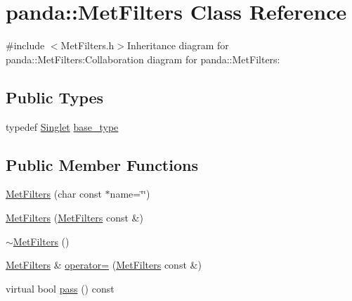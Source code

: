 \hypertarget{classpanda_1_1MetFilters}{
\section{panda::MetFilters Class Reference}
\label{classpanda_1_1MetFilters}
}


{\ttfamily \#include $<$MetFilters.h$>$}Inheritance diagram for panda::MetFilters:Collaboration diagram for panda::MetFilters:\subsection*{Public Types}
\begin{DoxyCompactItemize}
\item 
typedef \hyperlink{classpanda_1_1Singlet}{Singlet} \hyperlink{classpanda_1_1MetFilters_aa9b343ca5027d2786a87123abe1b0630}{base\_\-type}
\end{DoxyCompactItemize}
\subsection*{Public Member Functions}
\begin{DoxyCompactItemize}
\item 
\hyperlink{classpanda_1_1MetFilters_a165bae4810eedbd7fdee7259382398cf}{MetFilters} (char const $\ast$name=\char`\"{}\char`\"{})
\item 
\hyperlink{classpanda_1_1MetFilters_a2b0fb3d488715124a4bb61c4369fdb4b}{MetFilters} (\hyperlink{classpanda_1_1MetFilters}{MetFilters} const \&)
\item 
\hyperlink{classpanda_1_1MetFilters_a39343453635116981e0f1e8685333897}{$\sim$MetFilters} ()
\item 
\hyperlink{classpanda_1_1MetFilters}{MetFilters} \& \hyperlink{classpanda_1_1MetFilters_a7afdb0c8ff9d453cb699a8895ac07afa}{operator=} (\hyperlink{classpanda_1_1MetFilters}{MetFilters} const \&)
\item 
virtual bool \hyperlink{classpanda_1_1MetFilters_a36ea7af365dd672dddcdb1ed4e5b8a82}{pass} () const 
\end{DoxyCompactItemize}
